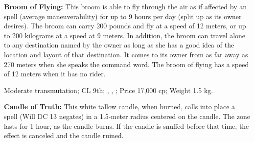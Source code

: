 \textbf{Broom of Flying:} This broom is able to fly through the air as if affected by an  spell (average maneuverability) for up to 9 hours per day (split up as its owner desires). The broom can carry 200 pounds and fly at a speed of 12 meters, or up to 200 kilograms at a speed at 9 meters. In addition, the broom can travel alone to any destination named by the owner as long as she has a good idea of the location and layout of that destination. It comes to its owner from as far away as 270 meters when she speaks the command word. The broom of flying has a speed of 12 meters when it has no rider.

Moderate transmutation; CL 9th; , , ; Price 17,000 cp; Weight 1.5 kg.









\textbf{Candle of Truth:} This white tallow candle, when burned, calls into place a  spell (Will DC 13 negates) in a 1.5-meter radius centered on the candle. The zone lasts for 1 hour, as the candle burns. If the candle is snuffed before that time, the effect is canceled and the candle ruined.


